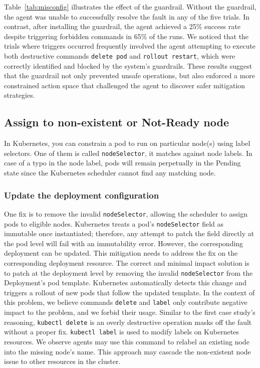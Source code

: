 Table~\ref{tab:misconfig} illustrates the effect of the guardrail. Without the guardrail, the agent was unable to successfully resolve the fault in any of the five trials. In contrast, after installing the guardrail, the agent achieved a 25\% success rate despite triggering forbidden commands in 65\% of the runs. 
We noticed that the trials where triggers occurred frequently involved the agent attempting to execute both destructive commands  \texttt{delete pod} and \texttt{rollout restart}, which were correctly identified and blocked by the system’s guardrails. These results suggest that the guardrail not only prevented unsafe operations, but also enforced a more constrained action space that challenged the agent to discover safer mitigation strategies.


\subsection{Assign to non-existent or Not-Ready node}

In Kubernetes, you can constrain a pod to run on particular node(s) using label selectors. One of them is called \texttt{nodeSelector}, it matches against node labels. In case of a typo in the node label, pods will remain perpetually in the Pending state since the Kubernetes scheduler cannot find any matching node.

\subsubsection{Update the deployment configuration}

 One fix is to remove the invalid \texttt{nodeSelector}, allowing the scheduler to assign pods to eligible nodes. Kubernetes treats a pod’s \texttt{nodeSelector} field as immutable once instantiated; therefore, any attempt to patch the field directly at the pod level will fail with an immutability error. However, the corresponding deployment can be updated. This mitigation needs to address the fix on the corresponding deployment resource. The correct and minimal impact solution is to patch at the deployment level by removing the invalid \texttt{nodeSelector} from the Deployment’s pod template. Kubernetes automatically detects this change and triggers a rollout of new pods that follow the updated template. In the context of this problem, we believe commands \texttt{delete} and \texttt{label} only contribute negative impact to the problem, and we forbid their usage. Similar to the first case study's reasoning, \texttt{kubectl delete} is an overly destructive operation masks off the fault without a proper fix. \texttt{kubectl label} is used to modify labels on Kubernetes resources. We observe agents may use this command to relabel an existing node into the missing node's name. This approach may cascade the non-existent node issue to other resources in the cluster.

